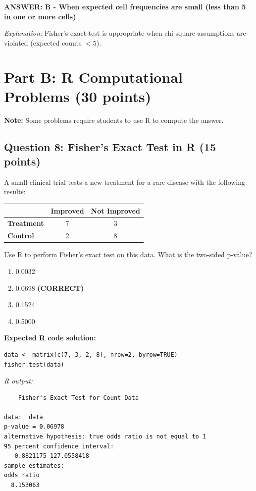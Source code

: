 \documentclass[11pt]{article}
\begin{document}
\textbf{ANSWER: B - When expected cell frequencies are small (less than 5 in one or more cells)}

\textit{Explanation:} Fisher's exact test is appropriate when chi-square assumptions are violated (expected counts $< 5$).

\newpage

\section{Part B: R Computational Problems (30 points)}

\textbf{Note:} Some problems require students to use R to compute the answer.

\subsection*{Question 8: Fisher's Exact Test in R (15 points)}

A small clinical trial tests a new treatment for a rare disease with the following results:

\begin{center}
\begin{tabular}{l|cc}
& \textbf{Improved} & \textbf{Not Improved} \\
\hline
\textbf{Treatment} & 7 & 3 \\
\textbf{Control} & 2 & 8 \\
\end{tabular}
\end{center}

Use R to perform Fisher's exact test on this data. What is the two-sided p-value?

\begin{enumerate}[label=\Alph*.]
\item 0.0032
\item 0.0698 \textbf{(CORRECT)}
\item 0.1524
\item 0.5000
\end{enumerate}

\vspace{0.5cm}

\textbf{Expected R code solution:}
\begin{verbatim}
data <- matrix(c(7, 3, 2, 8), nrow=2, byrow=TRUE)
fisher.test(data)
\end{verbatim}

\textit{R output:}
\begin{verbatim}
	Fisher's Exact Test for Count Data

data:  data
p-value = 0.06978
alternative hypothesis: true odds ratio is not equal to 1
95 percent confidence interval:
   0.8821175 127.0558418
sample estimates:
odds ratio
  8.153063
\end{verbatim}
\end{document}
